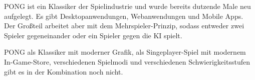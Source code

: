PONG ist ein Klassiker der Spielindustrie und wurde bereits dutzende Male neu aufgelegt.
Es gibt Desktopanwendungen, Webanwendungen und Mobile Apps. Der Großteil arbeitet aber mit dem Mehrspieler-Prinzip, sodass entweder zwei Spieler gegeneinander oder ein Spieler gegen die KI spielt.

PONG als Klassiker mit moderner Grafik, als Singeplayer-Spiel mit modernem In-Game-Store, verschiedenen Spielmodi und verschiedenen Schwierigkeitsstufen gibt es in der Kombination noch nicht. 